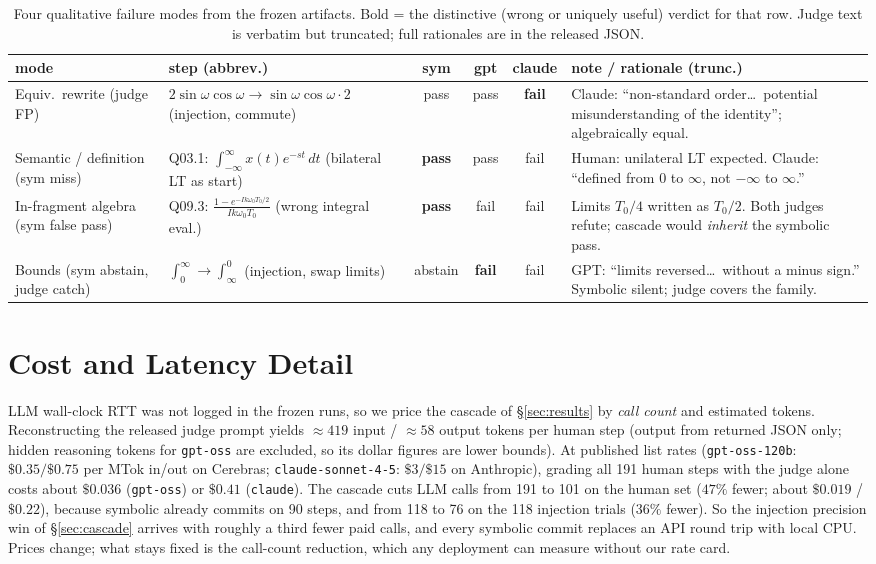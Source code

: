 \begin{table}[tp]
\centering
\footnotesize
\setlength{\tabcolsep}{3pt}
\begin{tabular}{p{1.55cm}p{3.6cm}ccc p{4.4cm}}
\toprule
mode & step (abbrev.) & sym & gpt & claude & note / rationale (trunc.) \\
\midrule
Equiv.\ rewrite (judge FP)
 & $2\sin\omega\cos\omega \!\to\! \sin\omega\cos\omega\cdot 2$
   (injection, commute)
 & pass & pass & \textbf{fail}
 & Claude: ``non-standard order\ldots\ potential misunderstanding of the
   identity''; algebraically equal. \\
\midrule
Semantic / definition (sym miss)
 & Q03.1: $\int_{-\infty}^{\infty}x(t)e^{-st}\,dt$
   (bilateral LT as start)
 & \textbf{pass} & pass & fail
 & Human: unilateral LT expected. Claude: ``defined from $0$ to $\infty$,
   not $-\infty$ to $\infty$.'' \\
\midrule
In-fragment algebra (sym false pass)
 & Q09.3: $\frac{1-e^{-Ik\omega_0 T_0/2}}{Ik\omega_0 T_0}$
   (wrong integral eval.)
 & \textbf{pass} & fail & fail
 & Limits $T_0/4$ written as $T_0/2$. Both judges refute; cascade would
   \emph{inherit} the symbolic pass. \\
\midrule
Bounds (sym abstain, judge catch)
 & $\int_0^{\infty}\!\to\!\int_{\infty}^{0}$
   (injection, swap limits)
 & abstain & \textbf{fail} & fail
 & GPT: ``limits reversed\ldots\ without a minus sign.'' Symbolic silent;
   judge covers the family. \\
\bottomrule
\end{tabular}
\caption{Four qualitative failure modes from the frozen artifacts. Bold =
the distinctive (wrong or uniquely useful) verdict for that row. Judge text is
verbatim but truncated; full rationales are in the released JSON.}
\label{tab:examples}
\end{table}

\section{Cost and Latency Detail}
\label{app:cost}

LLM wall-clock RTT was not logged in the frozen runs, so we price the cascade
of \S\ref{sec:results} by \emph{call count} and estimated tokens.
Reconstructing the released judge prompt yields $\approx 419$ input /
$\approx 58$ output tokens per human step (output from returned JSON only;
hidden reasoning tokens for \texttt{gpt-oss} are excluded, so its dollar
figures are lower bounds). At published list rates (\texttt{gpt-oss-120b}:
$\$0.35/\$0.75$ per MTok in/out on Cerebras; \texttt{claude-sonnet-4-5}:
$\$3/\$15$ on Anthropic), grading all 191 human steps with the judge alone
costs about $\$0.036$ (\texttt{gpt-oss}) or $\$0.41$ (\texttt{claude}). The
cascade cuts LLM calls from 191 to 101 on the human set ($47\%$ fewer; about
$\$0.019$ / $\$0.22$), because symbolic already commits on 90 steps, and from
118 to 76 on the 118 injection trials ($36\%$ fewer). So the injection
precision win of \S\ref{sec:cascade} arrives with roughly a third fewer paid
calls, and every symbolic commit replaces an API round trip with local CPU.
Prices change; what stays fixed is the call-count reduction, which any
deployment can measure without our rate card.

